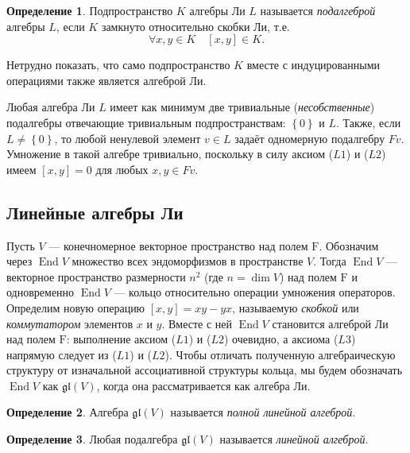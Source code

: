 \documentclass[a4paper, 12pt]{article}
\theoremstyle{definition}
\newtheorem{definition}{Определение}[section]
\begin{document}
\begin{definition}
    Подпространство \( K \) алгебры Ли \( L \) называется \textit{подалгеброй} алгебры \( L \), если \( K \) замкнуто относительно скобки Ли, т.е.
    \[
        \forall x, y \in K \quad [x, y] \in K.
    \]
\end{definition}

Нетрудно показать, что само подпространство \( K \) вместе с индуцированными операциями также является алгеброй Ли.

Любая алгебра Ли \( L \) имеет как минимум две тривиальные (\textit{несобственные}) подалгебры отвечающие тривиальным подпространствам: \( \left\{ 0 \right\} \) и \( L \).
Также, если \( L \neq \left\{ 0 \right\} \), то любой ненулевой элемент \( v \in L \) задаёт одномерную подалгебру \( Fv \). Умножение в такой алгебре тривиально, поскольку в силу аксиом (\( L 1 \)) и (\( L 2 \)) имеем \( [x, y] = 0 \) для любых \( x, y \in Fv \).

\subsection{Линейные алгебры Ли}
Пусть \( V \) --- конечномерное векторное пространство над полем \( \mathrm F \). Обозначим через \( \operatorname{End} V \) множество всех эндоморфизмов в пространстве \( V \). Тогда \( \operatorname{End} V \) --- векторное пространство размерности \( n^2 \) (где \( n = \dim V \)) над полем \( \mathrm F \) и одновременно \( \operatorname{End} V \) --- кольцо относительно операции умножения операторов. Определим новую операцию \( [x, y] = xy - yx \), называемую \textit{скобкой} или \textit{коммутатором} элементов \( x \) и \( y \). Вместе с ней \( \operatorname{End} V \) становится алгеброй Ли над полем \( \mathrm F \): выполнение аксиом (\( L 1 \)) и (\( L 2 \)) очевидно, а аксиома (\( L 3 \)) напрямую следует из (\( L 1 \)) и (\( L 2 \)). Чтобы отличать полученную алгебраическую структуру от изначальной ассоциативной структуры кольца, мы будем обозначать \( \operatorname{End} V \) как \( \mathfrak{gl}(V) \), когда она рассматривается как алгебра Ли.

\begin{definition}
    Алгебра \( \mathfrak{gl}(V) \) называется \textit{полной линейной алгеброй}.
\end{definition}

\begin{definition}
    Любая подалгебра \( \mathfrak{gl}(V) \) называется \textit{линейной алгеброй}.
\end{definition}
\end{document}
